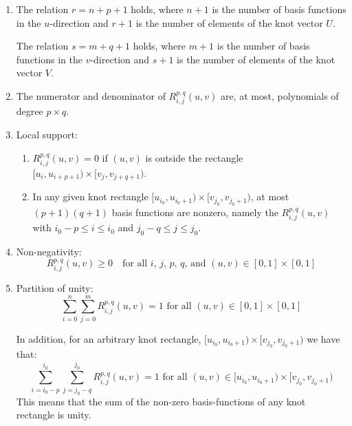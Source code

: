 \begin{enumerate}
    
    \item The relation $r = n + p + 1$ holds, where $n+1$ is the number of basis functions in the $u$-direction and $r+1$ is the number of elements of the knot vector $U$.

    The relation $s = m + q + 1$ holds, where $m+1$ is the number of basis functions in the $v$-direction and $s+1$ is the number of elements of the knot vector $V$.
    
    \item The numerator and denominator of $R_{i,j}^{p, q}(u, v)$ are, at most, polynomials of degree $p \times q$.
    
    \item Local support:
    \begin{enumerate}
        \item $R_{i,j}^{p, q}(u, v)=0$ if $(u,v)$ is outside the rectangle $[u_{i}, u_{i+p+1}) \times [v_{j}, v_{j+q+1})$.
        \item In any given knot rectangle $[u_{i_{0}}, u_{i_{0}+1}) \times [v_{j_{0}}, v_{j_{0}+1})$, at most $(p+1)(q+1)$ basis functions are nonzero, namely the $R_{i,j}^{p, q}(u, v)$ with $i_{0}-p \leq i \leq i_{0}$ and $j_{0}-q \leq j \leq j_{0}$.
    \end{enumerate}
    
    \item Non-negativity:
        \begin{equation*}
            R_{i,j}^{p, q}(u, v) \geq 0 \quad \text{for all $i$, $j$, $p$, $q$, and $(u,v) \in [0, 1] \times [0, 1]$}
        \end{equation*}

    \item Partition of unity:
        \begin{equation*}
            \sum_{i=0}^n  \sum_{j=0}^{m} R_{i,j}^{p, q}(u, v) = 1 \text{ for all } (u,v) \in [0, 1] \times [0, 1]
        \end{equation*}
        
        In addition, for an arbitrary knot rectangle, $[u_{i_{0}}, u_{i_{0}+1}) \times [v_{j_{0}}, v_{j_{0}+1})$ we have that:
            \begin{equation*}
                \sum_{i=i_{0}-p}^{i_{0}}\sum_{j=j_{0}-q}^{j_{0}} R_{i,j}^{p, q}(u, v) = 1 \text{ for all } (u,v) \in [u_{i_{0}}, u_{i_{0}+1}) \times [v_{j_{0}}, v_{j_{0}+1})
            \end{equation*}
        This means that the sum of the non-zero basis-functions of any knot rectangle is unity.
        

\end{enumerate}
